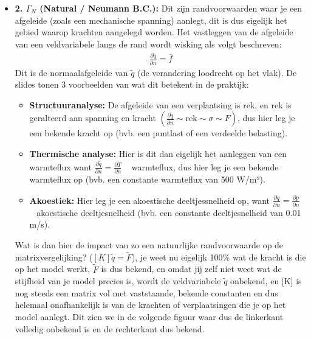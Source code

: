 \documentclass[a4paper,11pt,twoside]{report}
\begin{document}
\begin{itemize}
    \item \textbf{2. {\color{green}$\Gamma_N$} (Natural / Neumann B.C.):} Dit zijn randvoorwaarden
          waar je een afgeleide (zoals een mechanische spanning) aanlegt, dit is dus eigelijk het gebied
          waarop krachten aangelegd worden.
          \newline
          \newline
          Het vastleggen van de afgeleide van een veldvariabele langs de rand wordt wisking als volgt
          beschreven:
          \begin{align*}
              \frac{\partial \tilde{q}}{\partial n} = \bar{f}
          \end{align*}
          Dit is de normaalafgeleide van $\tilde{q}$ (de verandering loodrecht op het vlak). De slides
          tonen 3 voorbeelden van wat dit betekent in de praktijk:
          \begin{itemize}
              \item \textbf{Structuuranalyse:} De afgeleide van een verplaatsing is rek, en rek is geralteerd
                    aan spanning en kracht
                    $\left( \frac{\partial \tilde{q}}{\partial n} \sim \text{rek} \sim \sigma \sim F \right)$, dus
                    hier leg je een bekende kracht op (bvb. een puntlast of een verdeelde belasting).
              \item \textbf{Thermische analyse:} Hier is dit dan eigelijk het aanleggen van een warmteflux
                    want $\frac{\partial \tilde{q}}{\partial n} = \frac{\partial \tilde{T}}{\partial n}$ ~
                    warmteflux, dus hier leg je een bekende warmteflux op (bvb. een constante warmteflux van 500
                    W/m²).
              \item \textbf{Akoestiek:} Hier leg je een akoestische deeltjessnelheid op, want
                    $\frac{\partial \tilde{q}}{\partial n} = \frac{\partial \tilde{p}}{\partial n}$ ~ akoestische
                    deeltjesnelheid (bvb. een constante deeltjesnelheid van 0.01 m/s).
          \end{itemize}
          Wat is dan hier de impact van zo een natuurlijke randvoorwaarde op de matrixvergelijking?
          ($[K]\tilde{q} = \tilde{F}$), je weet nu eigelijk 100\% wat de kracht is die op het model werkt,
          $\tilde{F}$ is dus bekend, en omdat jij zelf niet weet wat de stijfheid van je model precies is,
          wordt de veldvariabele $\tilde{q}$ onbekend, en [K] is nog steeds een matrix vol met
          vaststaande, bekende constanten en dus helemaal onafhankelijk is van de krachten of
          verplaatsingen die je op het model aanlegt. Dit zien we in de volgende figuur waar dus de
          linkerkant volledig onbekend is en de rechterkant dus bekend.


\end{itemize}
\end{document}
